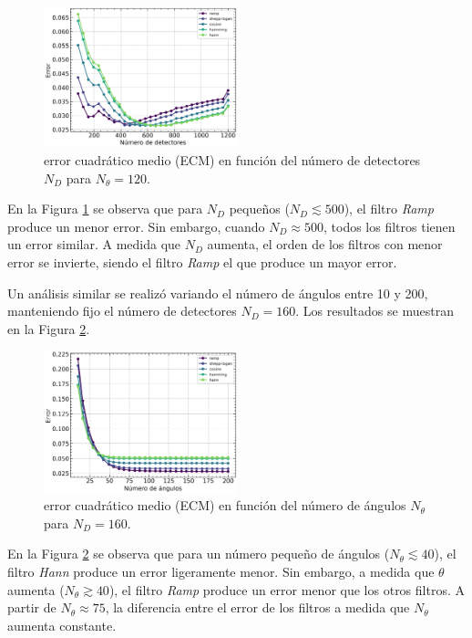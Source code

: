 \documentclass[11pt, twocolumn]{article}
\begin{document}
\begin{figure} [htbp]
    \centering
    \includegraphics*[width=0.5\textwidth]{./images/ej_4/scale_error_2.png}
    \caption{error cuadrático medio (ECM) en función del número de detectores $N_D$ para $N_\theta = 120$.}
    \label{fig:error_escalas}
\end{figure}


En la Figura \ref{fig:error_escalas} se observa que para $N_D$ pequeños ($N_D \lesssim 500$), el filtro \textit{Ramp} produce un menor error. Sin embargo, cuando $N_D \approx 500$, todos los filtros tienen un error similar. A medida que $N_D$ aumenta, el orden de los filtros con menor error se invierte, siendo el filtro \textit{Ramp} el que produce un mayor error.

Un análisis similar se realizó variando el número de ángulos entre 10 y 200, manteniendo fijo el número de detectores $N_D = 160$. Los resultados se muestran en la Figura \ref{fig:error_angulos}.

\begin{figure} [htbp]
    \centering
    \includegraphics*[width=0.5\textwidth]{./images/ej_4/angle_error_2.png}
    \caption{error cuadrático medio (ECM) en función del número de ángulos $N_\theta$ para $N_D = 160$.}
    \label{fig:error_angulos}
\end{figure}

En la Figura \ref{fig:error_angulos} se observa que para un número pequeño de ángulos ($N_\theta \lesssim 40$), el filtro \textit{Hann} produce un error ligeramente menor. Sin embargo, a medida que $\theta$ aumenta ($N_\theta \gtrsim 40$), el filtro \textit{Ramp} produce un error menor que los otros filtros. A partir de $N_\theta \approx 75$, la diferencia entre el error de los filtros a medida que $N_\theta$ aumenta constante.
\end{document}
